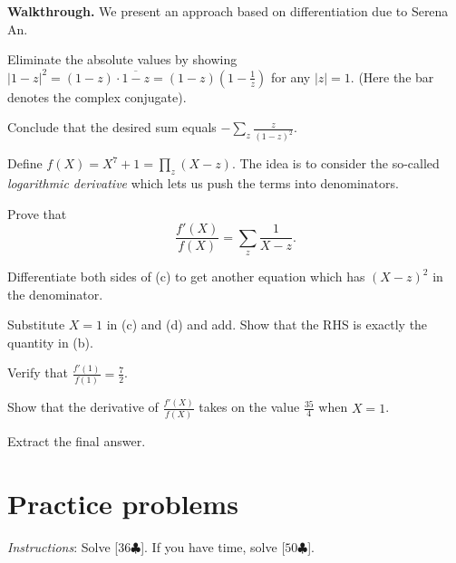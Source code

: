 \documentclass[11pt]{scrartcl}
\providecommand{\clubg}[1]{\bgroup\color{green!40!black}[$#1\clubsuit$]\egroup}
\providecommand{\ol}{\overline}
\providecommand{\ii}{\item}
\newenvironment{walkthrough}{\noindent\textbf{\color{green!40!black}Walkthrough.}}{}
\newcommand{\goals}[2]{\bgroup
\sffamily\small \emph{Instructions}: Solve \clubg{#1}.
If you have time, solve \clubg{#2}.\egroup\par}
\begin{document}
\begin{walkthrough}
We present an approach based on differentiation due to Serena An.

\begin{walk}
  \ii Eliminate the absolute values by showing
  $|1-z|^2 = (1-z) \cdot \ol{1-z} = (1-z)(1-\frac 1z)$ for any $|z| = 1$.
  (Here the bar denotes the complex conjugate).

  \ii Conclude that the desired sum equals $- \sum_z \frac{z}{(1-z)^2}$.
\end{walk}
Define $f(X) = X^7+1 = \prod_z (X-z)$.
The idea is to consider the so-called
\emph{logarithmic derivative} which lets us push
the terms into denominators.
\begin{walk}[resume]
  \ii Prove that
  \[ \frac{f'(X)}{f(X)} = \sum_z \frac{1}{X-z}. \]
  \ii Differentiate both sides of (c) to get another equation
  which has $(X-z)^2$ in the denominator.
  \ii Substitute $X=1$ in (c) and (d) and add.
  Show that the RHS is exactly the quantity in (b).
  \ii Verify that $\frac{f'(1)}{f(1)} = \frac72$.
  \ii Show that the derivative of $\frac{f'(X)}{f(X)}$
  takes on the value $\frac{35}{4}$ when $X=1$.
  \ii Extract the final answer.
\end{walk}
\end{walkthrough}

\newpage

\section*{Practice problems}
\goals{36}{50}
\end{document}
